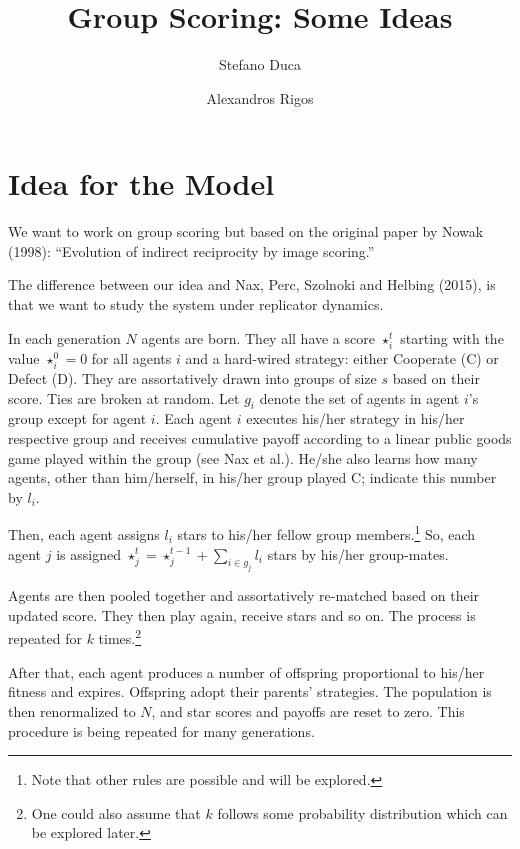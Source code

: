 \documentclass[12pt,a4paper]{article}
\title{Group Scoring: Some Ideas}
\author{Stefano Duca \and Alexandros Rigos}
\begin{document}
\maketitle
\section{Idea for the Model}

We want to work on group scoring but based on the original paper by Nowak (1998): ``Evolution of indirect reciprocity by image scoring.''

The difference between our idea and  Nax, Perc, Szolnoki and Helbing (2015), is that we want to study the system under replicator dynamics.

In each generation $N$ agents are born. They all have a score $\star_i^t$ starting with the value $\star_i^0=0$ for all agents $i$ and a hard-wired strategy: either Cooperate (C) or Defect (D). They are assortatively drawn into groups of size $s$ based on their score. Ties are broken at random. Let $g_i$ denote the set of agents in agent $i$'s group except for agent $i$. Each agent $i$ executes his/her strategy in his/her respective group and receives cumulative payoff according to a linear public goods game played within the group (see Nax et al.). He/she also learns how many agents, other than him/herself, in his/her group played C; indicate this number by $l_i$.

Then, each agent assigns $l_i$ stars to his/her fellow group members.\footnote{Note that other rules are possible and will be explored.} So, each agent $j$ is assigned $\star_j^t=\star_j^{t-1}+\sum_{i\in g_j} l_i$ stars by his/her group-mates. 

Agents are then pooled together and assortatively re-matched based on their updated score. They then play again, receive stars and so on. The process is repeated for $k$ times.\footnote{One could also assume that $k$ follows some probability distribution which can be explored later.} 

After that, each agent produces a number of offspring proportional to his/her fitness and expires. Offspring adopt their parents' strategies. The population is then renormalized to $N$, and star scores and payoffs are reset to zero. This procedure is being repeated for many generations.
\end{document}
